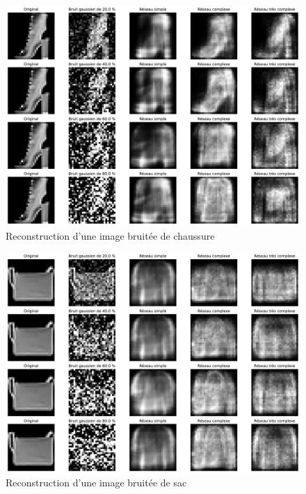 \documentclass{article}
\begin{document}
\begin{figure}[htbp]
    \centering
    \includegraphics*[width=\textwidth]{reconstruct_noisy_chaussure.pdf}
    \caption{Reconstruction d'une image bruitée de chaussure}
    \label{fig:reconstructnoisychaussure}
\end{figure}

\begin{figure}[htbp]
    \centering
    \includegraphics*[width=\textwidth]{reconstruct_noisy_sac.pdf}
    \caption{Reconstruction d'une image bruitée de sac}
    \label{fig:reconstructnoisybag}
\end{figure}
\end{document}
